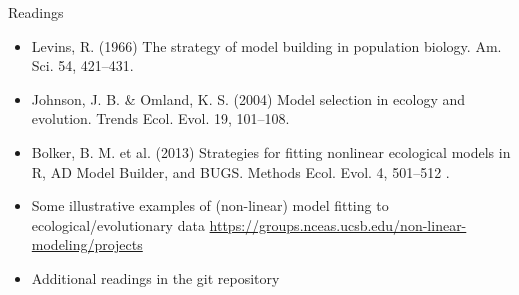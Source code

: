 \documentclass[xcolor=x11names,compress]{beamer}
\renewcommand{\(}{\begin{columns}}
\renewcommand{\)}{\end{columns}}
\newcommand{\<}[1]{\begin{column}{#1}}
\renewcommand{\>}{\end{column}}
\begin{document}
\begin{frame}{Readings}

\begin{itemize}

\item Levins, R. (1966) The strategy of model building in population 
biology. Am. Sci. 54, 421--431.  

\item Johnson, J. B. \& Omland, K. S. (2004) Model selection in ecology 
and evolution. Trends Ecol. Evol. 19, 101--108. 

\item Bolker, B. M. et al.  (2013) Strategies for fitting nonlinear ecological models in R, AD Model Builder, and BUGS. Methods Ecol. Evol. 4, 501--512 .

\item Some illustrative examples of (non-linear) model fitting to 
ecological/evolutionary data 
\url{https://groups.nceas.ucsb.edu/non-linear-modeling/projects} 

\item Additional readings in the git repository 
 
\end{itemize}
\end{frame}
\end{document}
